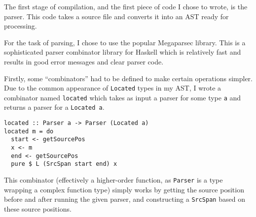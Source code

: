 \documentclass[9pt]{extarticle}
\begin{document}
The first stage of compilation, and the first piece of code I chose to
wrote, is the parser. This code takes a source file and converts it into
an AST ready for processing.

For the task of parsing, I chose to use the popular Megaparsec library.
This is a sophisticated parser combinator library for Haskell which is
relatively fast and results in good error messages and clear parser
code.

Firstly, some ``combinators'' had to be defined to make certain
operations simpler. Due to the common appearance of \verb'Located' types
in my AST, I wrote a combinator named \verb'located' which takes as
input a parser for some type \verb'a' and returns a parser for a
\verb'Located a'.

\begin{verbatim}
located :: Parser a -> Parser (Located a)
located m = do
  start <- getSourcePos
  x <- m
  end <- getSourcePos
  pure $ L (SrcSpan start end) x
\end{verbatim}

This combinator (effectively a higher-order function, as \verb'Parser'
is a type wrapping a complex function type) simply works by getting the
source position before and after running the given parser, and
constructing a \verb'SrcSpan' based on these source positions.
\end{document}
